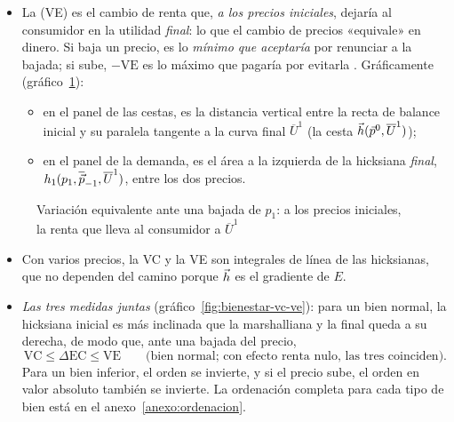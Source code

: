 \documentclass[11pt]{article}
\begin{document}
\begin{itemize}
\item La  (VE) es el cambio de renta que, \emph{a los precios iniciales}, dejaría al consumidor en la utilidad \emph{final}: lo que el cambio de precios «equivale» en dinero.
  Si baja un precio, es lo \emph{mínimo que aceptaría} por renunciar a la bajada; si sube, $-\mathrm{VE}$ es lo máximo que pagaría por evitarla .
  Gráficamente (gráfico~\ref{fig:bienestar-ve}):
  \begin{itemize}
  \item en el panel de las cestas, es la distancia vertical entre la recta de balance inicial y su paralela tangente a la curva final $\overline{U}^1$ (la cesta $\vec{h}(\vec{p}^0,\overline{U}^1)$);
  \item en el panel de la demanda, es el área a la izquierda de la hicksiana \emph{final}, $h_1(p_1,\overline{\vec{p}}_{-1},\overline{U}^1)$, entre los dos precios.
  \end{itemize}
\end{itemize}

\begin{figure}[H]
\centering
\caption{Variación equivalente ante una bajada de $p_1$: a los precios iniciales, la renta que lleva al consumidor a $\overline{U}^1$}\label{fig:bienestar-ve}
\end{figure}

\begin{itemize}
\item Con varios precios, la VC y la VE son integrales de línea de las hicksianas, que no dependen del camino porque $\vec{h}$ es el gradiente de $E$.
\item \emph{Las tres medidas juntas} (gráfico~\ref{fig:bienestar-vc-ve}): para un bien normal, la hicksiana inicial es más inclinada que la marshalliana y la final queda a su derecha, de modo que, ante una bajada del precio,
  \begin{equation}
  \mathrm{VC}\leq\Delta\mathrm{EC}\leq \mathrm{VE} \qquad\text{(bien normal; con efecto renta nulo, las tres coinciden).} \label{eq:orden-normal}
  \end{equation}
  Para un bien inferior, el orden se invierte, y si el precio sube, el orden en valor absoluto también se invierte. La ordenación completa para cada tipo de bien está en el anexo~\ref{anexo:ordenacion}.
\end{itemize}
\end{document}
